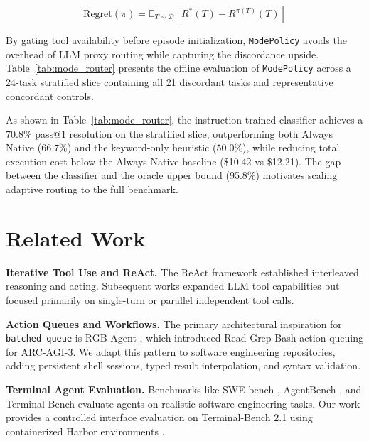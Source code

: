 \documentclass{article}
\begin{document}
\begin{equation}
\text{Regret}(\pi) = \mathbb{E}_{T \sim \mathcal{D}} \left[ R^*(T) - R^{\pi(T)}(T) \right]
\end{equation}

By gating tool availability before episode initialization, \texttt{ModePolicy} avoids the overhead of LLM proxy routing while capturing the discordance upside. Table~\ref{tab:mode_router} presents the offline evaluation of \texttt{ModePolicy} across a 24-task stratified slice containing all 21 discordant tasks and representative concordant controls.

\begin{table}[ht]
\centering
\caption{ModePolicy Strategy Evaluation on 24-Task Stratified Terminal-Bench Slice (offline, frozen outcomes).}
\label{tab:mode_router}
\small

\end{table}

As shown in Table~\ref{tab:mode_router}, the instruction-trained classifier achieves a 70.8\% pass@1 resolution on the stratified slice, outperforming both Always Native ($66.7\%$) and the keyword-only heuristic ($50.0\%$), while reducing total execution cost below the Always Native baseline (\$10.42 vs \$12.21). The gap between the classifier and the oracle upper bound (95.8\%) motivates scaling adaptive routing to the full benchmark.

\section{Related Work}

\textbf{Iterative Tool Use and ReAct.} The ReAct framework \citep{react2022} established interleaved reasoning and acting. Subsequent works \citep{toolformer2023, gorilla2023} expanded LLM tool capabilities but focused primarily on single-turn or parallel independent tool calls.

\textbf{Action Queues and Workflows.} The primary architectural inspiration for \texttt{batched-queue} is RGB-Agent \citep{rgb_agent2025}, which introduced Read-Grep-Bash action queuing for ARC-AGI-3. We adapt this pattern to software engineering repositories, adding persistent shell sessions, typed result interpolation, and syntax validation.

\textbf{Terminal Agent Evaluation.} Benchmarks like SWE-bench \citep{swebench2024}, AgentBench \citep{agentbench2023}, and Terminal-Bench \citep{terminalbench2025} evaluate agents on realistic software engineering tasks. Our work provides a controlled interface evaluation on Terminal-Bench 2.1 using containerized Harbor environments \citep{harbor2025}.
\end{document}
